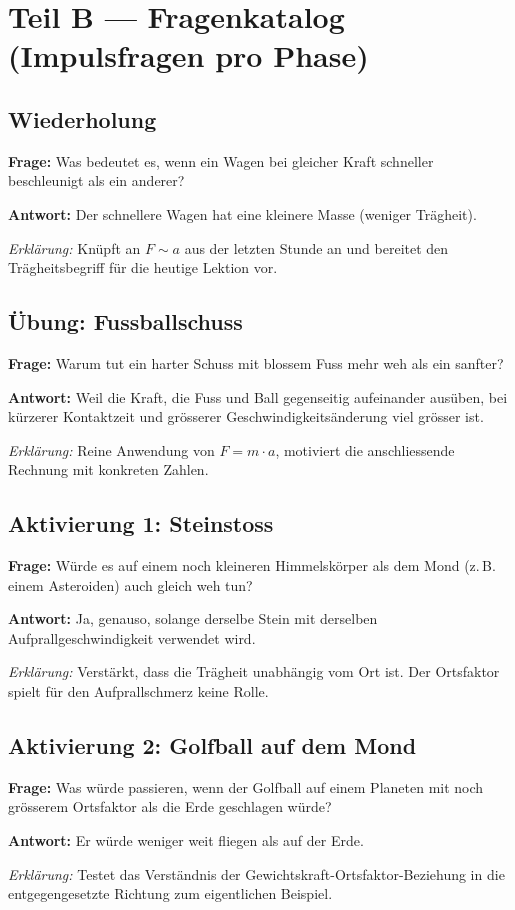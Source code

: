 \documentclass[11pt,a4paper]{article}
\newcommand{\Frage}[1]{\textbf{Frage:} #1\par}
\newcommand{\Antwort}[1]{\textbf{Antwort:} #1\par}
\newcommand{\Erklaerung}[1]{\textit{Erklärung:} #1}
\newcommand{\FrageBlock}[3]{\Frage{#1}\Antwort{#2}\Erklaerung{#3}\vspace{0.6em}}
\begin{document}
\section*{Teil B --- Fragenkatalog (Impulsfragen pro Phase)}

\subsection*{Wiederholung}

\FrageBlock{Was bedeutet es, wenn ein Wagen bei gleicher Kraft schneller beschleunigt als ein anderer?}
{Der schnellere Wagen hat eine kleinere Masse (weniger Trägheit).}
{Knüpft an $F\sim a$ aus der letzten Stunde an und bereitet den Trägheitsbegriff für die heutige Lektion vor.}

\subsection*{Übung: Fussballschuss}

\FrageBlock{Warum tut ein harter Schuss mit blossem Fuss mehr weh als ein sanfter?}
{Weil die Kraft, die Fuss und Ball gegenseitig aufeinander ausüben, bei kürzerer Kontaktzeit und grösserer Geschwindigkeitsänderung viel grösser ist.}
{Reine Anwendung von $F=m\cdot a$, motiviert die anschliessende Rechnung mit konkreten Zahlen.}

\subsection*{Aktivierung 1: Steinstoss}

\FrageBlock{Würde es auf einem noch kleineren Himmelskörper als dem Mond (z.\,B. einem Asteroiden) auch gleich weh tun?}
{Ja, genauso, solange derselbe Stein mit derselben Aufprallgeschwindigkeit verwendet wird.}
{Verstärkt, dass die Trägheit unabhängig vom Ort ist. Der Ortsfaktor spielt für den Aufprallschmerz keine Rolle.}

\subsection*{Aktivierung 2: Golfball auf dem Mond}

\FrageBlock{Was würde passieren, wenn der Golfball auf einem Planeten mit noch grösserem Ortsfaktor als die Erde geschlagen würde?}
{Er würde weniger weit fliegen als auf der Erde.}
{Testet das Verständnis der Gewichtskraft-Ortsfaktor-Beziehung in die entgegengesetzte Richtung zum eigentlichen Beispiel.}
\end{document}
